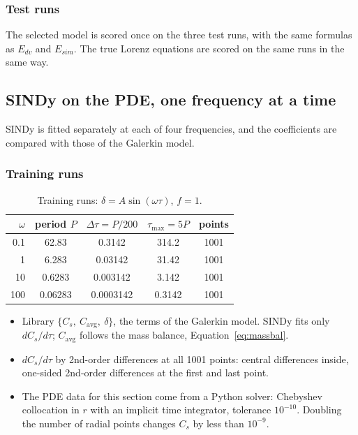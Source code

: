 \documentclass[11pt,a4paper]{article}
\newcommand{\avg}{\mathrm{avg}}
\begin{document}
\subsubsection{Test runs}
The selected model is scored once on the three test runs, with the same formulas as $E_{dv}$ and $E_{sim}$. The true Lorenz equations are scored on the same runs in the same way.
\begin{table}[H]\centering\small

\caption{Test errors (fractions), mean over the three test runs. ODE solver tolerance: $10^{-10}$.}
\end{table}

\subsection{SINDy on the PDE, one frequency at a time}
SINDy is fitted separately at each of four frequencies, and the coefficients are compared with those of the Galerkin model.

\subsubsection{Training runs}
\begin{table}[H]\centering\small
\begin{tabular}{rcccc}\toprule
$\omega$ & period $P$ & $\Delta\tau=P/200$ & $\tau_{\max}=5P$ & points\\\midrule
0.1 & 62.83 & 0.3142 & 314.2 & 1001\\
1 & 6.283 & 0.03142 & 31.42 & 1001\\
10 & 0.6283 & 0.003142 & 3.142 & 1001\\
100 & 0.06283 & 0.0003142 & 0.3142 & 1001\\\bottomrule
\end{tabular}
\caption{Training runs: $\delta = A\sin(\omega\tau)$, $f=1$.}
\end{table}
\begin{itemize}
  \item Library $\{C_s,\ C_\avg,\ \delta\}$, the terms of the Galerkin model. SINDy fits only $dC_s/d\tau$; $C_\avg$ follows the mass balance, Equation~\eqref{eq:massbal}.
  \item $dC_s/d\tau$ by 2nd-order differences at all 1001 points: central differences inside, one-sided 2nd-order differences at the first and last point.
  \item The PDE data for this section come from a Python solver: Chebyshev collocation in $r$ with an implicit time integrator, tolerance $10^{-10}$. Doubling the number of radial points changes $C_s$ by less than $10^{-9}$.
\end{itemize}
\end{document}
